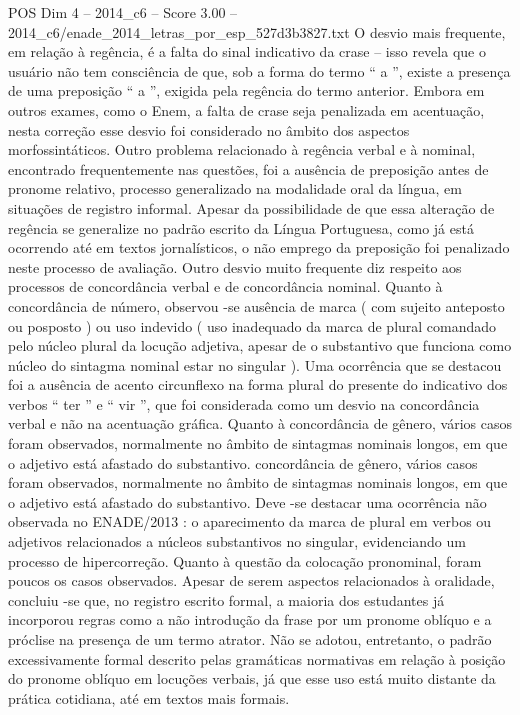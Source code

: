 \begin{textsample}{POS Dim 4 – 2014\_c6 – Score 3.00 – 2014\_c6/enade\_2014\_letras\_por\_esp\_527d3b3827.txt}
O desvio mais frequente, em relação à regência, é a falta do sinal indicativo da crase – isso revela que o usuário não tem consciência de que, sob a forma do termo “ a ”, existe a presença de uma preposição “ a ”, exigida pela regência do termo anterior.
Embora em outros exames, como o Enem, a falta de crase seja penalizada em acentuação, nesta correção esse desvio foi considerado no âmbito dos aspectos morfossintáticos.
Outro problema relacionado à regência verbal e à nominal, encontrado frequentemente nas questões, foi a ausência de preposição antes de pronome relativo, processo generalizado na modalidade oral da língua, em situações de registro informal.
Apesar da possibilidade de que essa alteração de regência se generalize no padrão escrito da Língua Portuguesa, como já está ocorrendo até em textos jornalísticos, o não emprego da preposição foi penalizado neste processo de avaliação.
Outro desvio muito frequente diz respeito aos processos de concordância verbal e de concordância nominal.
Quanto à concordância de número, observou -se ausência de marca ( com sujeito anteposto ou posposto ) ou uso indevido ( uso inadequado da marca de plural comandado pelo núcleo plural da locução adjetiva, apesar de o substantivo que funciona como núcleo do sintagma nominal estar no singular ).
Uma ocorrência que se destacou foi a ausência de acento circunflexo na forma plural do presente do indicativo dos verbos “ ter ” e “ vir ”, que foi considerada como um desvio na concordância verbal e não na acentuação gráfica.
Quanto à concordância de gênero, vários casos foram observados, normalmente no âmbito de sintagmas nominais longos, em que o adjetivo está afastado do substantivo. concordância de gênero, vários casos foram observados, normalmente no âmbito de sintagmas nominais longos, em que o adjetivo está afastado do substantivo.
Deve -se destacar uma ocorrência não observada no ENADE/2013 : o aparecimento da marca de plural em verbos ou adjetivos relacionados a núcleos substantivos no singular, evidenciando um processo de hipercorreção.
Quanto à questão da colocação pronominal, foram poucos os casos observados.
Apesar de serem aspectos relacionados à oralidade, concluiu -se que, no registro escrito formal, a maioria dos estudantes já incorporou regras como a não introdução da frase por um pronome oblíquo e a próclise na presença de um termo atrator.
Não se adotou, entretanto, o padrão excessivamente formal descrito pelas gramáticas normativas em relação à posição do pronome oblíquo em locuções verbais, já que esse uso está muito distante da prática cotidiana, até em textos mais formais.

\end{textsample}

